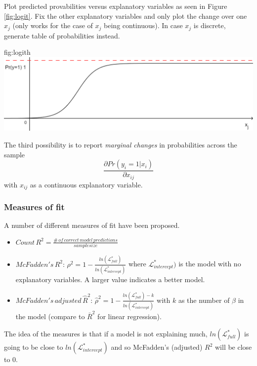 			Plot predicted provabilities versus explanatory variables as seen in Figure \ref{fig:logit}. Fix the other explanatory variables and only plot the change over one $x_j$ (only works for the case of $x_j$ being continuous). In case $x_j$ is discrete, generate table of probabilities instead.
			\begin{fig}{fig:logit}{h}
				\includegraphics[width=\textwidth]{P18logit.png}	
			\end{fig}				
			The third possibility is to report \emph{marginal changes} in probabilities across the sample
			\begin{equation*}
				\frac{\partial Pr(y_i=1|x_i)}{\partial x_{ij}}
			\end{equation*}
			with $x_{ij}$ as a continuous explanatory variable.
	\subsubsection{Measures of fit}\label{sec:mofit}
		A number of different measures of fit have been proposed.
		\begin{itemize}
			\item $Count\,R^2=\frac{\#\,of\,correct\,model\,predictions}{samplesize}$
			\item $McFadden's\,R^2:\,\rho^2=1-\frac{ln(\mathcal{L}^*_{full})}{ln(\mathcal{L}^*_{intercept})}$ where $\mathcal{L}^*_{intercept})$ is the model with no explanatory variables. A larger value indicates a better model.
			\item $McFadden's\,adjusted\,\hat{R}^2:\,\hat{\rho}^2=1-\frac{ln(\mathcal{L}^*_{full})-k}{ln(\mathcal{L}^*_{intercept})}$ with $k$ as the number of $\beta$ in the model (compare to $\bar{R}^2$ for linear regression).
		\end{itemize}
		 The idea of the measures is that if a model is not explaining much, $ln(\mathcal{L}^*_{full})$ is going to be close to $ln(\mathcal{L}^*_{intercept})$ and so McFadden's (adjusted) $R^2$ will be close to 0.
		 		
